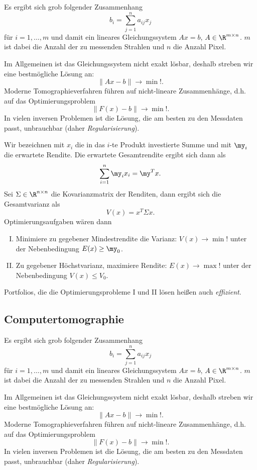 Es ergibt sich grob folgender Zusammenhang
\[
	b_i = \sum_{j=1}^n a_{ij} x_j
\]
für $i = 1, \dotsc, m$ und damit ein lineares Gleichungssystem $Ax = b$, $A \in \R^{m\times n}$.
$m$ ist dabei die Anzahl der zu messenden Strahlen und $n$ die Anzahl Pixel.

Im Allgemeinen ist das Gleichungssystem nicht exakt lösbar, deshalb streben wir eine bestmögliche Lösung an:
\[
	\|Ax - b\| \to \min!.
\]
Moderne Tomographieverfahren führen auf nicht-lineare Zusammenhänge, d.h. auf das Optimierungsproblem
\[
	\|F(x) - b\| \to \min!.
\]
In vielen inversen Problemen ist die Lösung, die am besten zu den Messdaten passt, unbrauchbar (daher \emph{Regularisierung}).




Wir bezeichnen mit $x_i$ die in das $i$-te Produkt investierte Summe und mit $\my_i$ die erwartete Rendite.
Die erwartete Gesamtrendite ergibt sich dann als
\[
	\sum_{i=1}^n \my_i x_i = \my^T x.
\]
Sei $\Sigma \in \R^{n\times n}$ die Kovarianzmatrix der Renditen, dann ergibt sich die Gesamtvarianz als
\[
	V(x) = x^T \Sigma x.
\]
Optimierungsaufgaben wären dann
\begin{enumerate}[I.]
	\item
		Minimiere zu gegebener Mindestrendite die Varianz:
		$V(x) \to \min!$ unter der Nebenbedingung $E(x) \ge \my_0$.
	\item
		Zu gegebener Höchstvarianz, maximiere Rendite:
		$E(x) \to \max!$ unter der Nebenbedingung $V(x) \le V_0$.
\end{enumerate}
Portfolios, die die Optimierungsprobleme I und II lösen heißen auch \emph{effizient}.

\subsection{Computertomographie}

Es ergibt sich grob folgender Zusammenhang
\[
	b_i = \sum_{j=1}^n a_{ij} x_j
\]
für $i = 1, \dotsc, m$ und damit ein lineares Gleichungssystem $Ax = b$, $A \in \R^{m\times n}$.
$m$ ist dabei die Anzahl der zu messenden Strahlen und $n$ die Anzahl Pixel.

Im Allgemeinen ist das Gleichungssystem nicht exakt lösbar, deshalb streben wir eine bestmögliche Lösung an:
\[
	\|Ax - b\| \to \min!.
\]
Moderne Tomographieverfahren führen auf nicht-lineare Zusammenhänge, d.h. auf das Optimierungsproblem
\[
	\|F(x) - b\| \to \min!.
\]
In vielen inversen Problemen ist die Lösung, die am besten zu den Messdaten passt, unbrauchbar (daher \emph{Regularisierung}).



